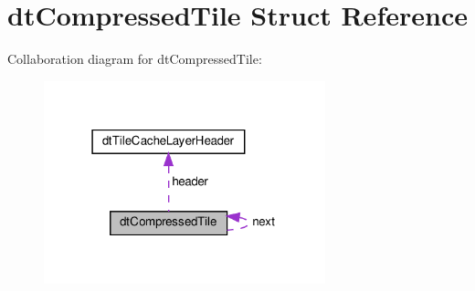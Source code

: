 \hypertarget{structdtCompressedTile}{}\section{dt\+Compressed\+Tile Struct Reference}
\label{structdtCompressedTile}


Collaboration diagram for dt\+Compressed\+Tile\+:
\nopagebreak
\begin{figure}[H]
\begin{center}
\leavevmode
\includegraphics[width=231pt]{structdtCompressedTile__coll__graph}
\end{center}
\end{figure}

